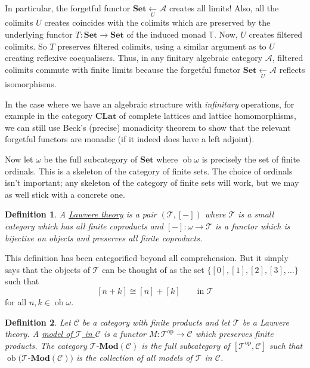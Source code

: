 \documentclass[a4paper,11pt]{article}
\theoremstyle{break_italics}
\newtheorem*{definition*}{Definition}
\theoremstyle{break_upright}
\theoremstyle{remark}
\newcommand{\ob}{\operatorname{ob}}
\newcommand{\C}{\mathcal{C}}
\newcommand{\Set}{\mathbf{Set}}
\newcommand{\op}{\mathrm{op}}
\begin{document}
In particular, the forgetful functor $\Set \xleftarrow[U]{} \mathcal A$ creates all limits! Also, all the colimits $U$ creates coincides with the colimits which are preserved by the underlying functor $T \colon \Set \to \Set$ of the induced monad $\mathbb T$. Now, $U$ creates filtered colimits. So $T$ preserves filtered colimits, using a similar argument as to $U$ creating reflexive coequalisers. Thus, in any finitary algebraic category $\mathcal A$, filtered colimits commute with finite limits because the forgetful functor $\Set \xleftarrow[U]{} \mathcal A$ reflects isomorphisms.

In the case where we have an algebraic structure with \textit{infinitary} operations, for example in the category $\mathbf{CLat}$ of complete lattices and lattice homomorphisms, we can still use Beck's (precise) monadicity theorem to show that the relevant forgetful functors are monadic (if it indeed does have a left adjoint).

Now let $\omega$ be the full subcategory of $\Set$ where $\ob\omega$ is precisely the set of finite ordinals. This is a skeleton of the category of finite sets. The choice of ordinals isn't important; any skeleton of the category of finite sets will work, but we may as well stick with a concrete one.

\begin{definition*}
	A \uline{Lawvere theory} is a pair $(\mathcal T, [-])$ where $\mathcal T$ is a small category which has all finite coproducts and $[-] \colon \mathbb \omega \to \mathcal T$ is a functor which is bijective on objects and preserves all finite coproducts.
\end{definition*}

This definition has been categorified beyond all comprehension. But it simply says that the objects of $\mathcal T$ can be thought of as the set $\{[0], [1], [2], [3], \dots\}$ such that
\[
	[n + k] \cong [n] + [k] \qquad \text{in }\mathcal T
\]
for all $n,k \in \ob\omega$.

\begin{definition*}
	Let $\C$ be a category with finite products and let $\mathcal T$ be a Lawvere theory. A \uline{model of $\mathcal T$ in $\C$} is a functor $M \colon \mathcal T^\op \to \C$ which preserves finite products. The category $\mathcal T\text{-}\mathbf{Mod}(\C)$ is the full subcategory of $[\mathcal T^\op, \C]$ such that $\ob \big(\mathcal T\text{-}\mathbf{Mod}(\C)\big)$ is the collection of all models of $\mathcal T$ in $\C$.
\end{definition*}
\end{document}
